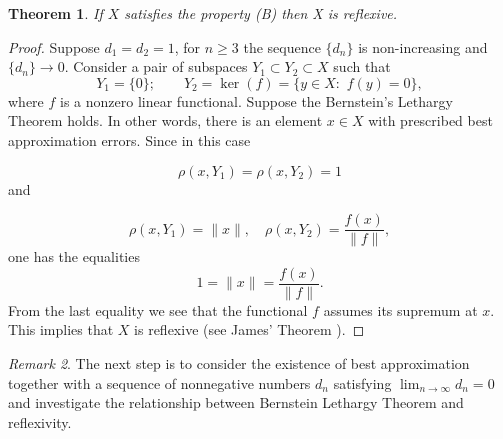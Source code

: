 \documentclass[12pt, reqno]{amsart}
\newtheorem{theorem}{Theorem}[section]
\theoremstyle{definition}
\theoremstyle{remark}
\newtheorem{remark}[theorem]{Remark}
\numberwithin{equation}{section}
\begin{document}
\begin{theorem}
If $X$ satisfies the property (B) then X is reflexive.
\end{theorem}
\begin{proof}
Suppose   $d_1 = d_2=1$, for $n \geq 3$  the sequence $\{d_n\}$  is non-increasing and $\{d_n\} \to 0$.
Consider a pair of subspaces $Y_1\subset Y_2 \subset X$ such that
$$
Y_1= \{0\};\quad \quad Y_2= \ker (f)= \{ y\in X: \,\, f(y)=0\},
$$
where $f$ is a nonzero linear functional. Suppose the Bernstein's Lethargy Theorem holds.  In other words, there is an element $x\in X$ with prescribed best approximation errors. Since in this case

 $$ \rho(x, Y_1)= \rho(x, Y_2)= 1$$ and

$$\rho(x, Y_1)= \|x\|, \quad \rho(x, Y_2)= \displaystyle\frac{f(x)}{\|f\|}, $$  one has the equalities
$$ 1= \|x\|= \displaystyle\frac{f(x)}{\|f\|}.$$
 From the last equality we see that the functional $f$ assumes its supremum at $x$.   This implies that  $X$ is reflexive (see James' Theorem \cite{RCJ}).
\end{proof}

\begin{remark}
The next  step is to consider the existence of best approximation together with a sequence of nonnegative numbers $d_n$ satisfying $\displaystyle \lim_{n\to \infty} d_n=0$ and investigate the relationship between Bernstein Lethargy Theorem and reflexivity. 
\end{remark}
 \iffalse
 
\end{document}
